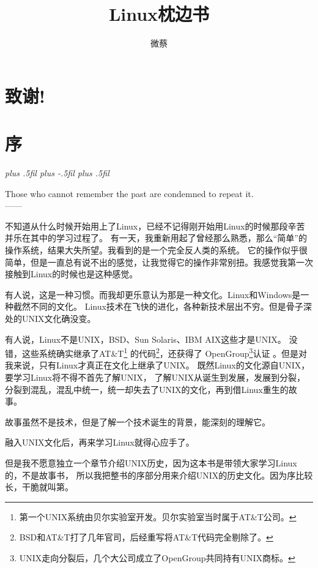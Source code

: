 \documentclass[amstex]{ctexbook}
\title{Linux枕边书}
\author{微蔡}
\newcommand{\RTLpar}{%
  \leftskip=0pt plus .5fil%
  \rightskip=0pt plus -.5fil%
  \parfillskip=0pt plus .5fil%
}
\newenvironment{quotes}[2][0.55]{\pushQED{#2}%
\begin{flushright}%
\begin{minipage}{#1\textwidth}\begin{flushright}\noindent\it\RTLpar}{%
 \\------\popQED{}\end{flushright}\end{minipage}\end{flushright}}%
\begin{document}



\chapter*{致谢!}



\tableofcontents

\chapter{序}
\begin{quotes}{George Santayana}
Those who cannot remember the past are condemned to repeat it.
\end{quotes}


不知道从什么时候开始用上了Linux，已经不记得刚开始用Linux的时候那段辛苦并乐在其中的学习过程了。
有一天，我重新用起了曾经那么熟悉，那么“简单”的操作系统，结果大失所望。我看到的是一个完全反人类的系统。
它的操作似乎很简单，但是一直总有说不出的感觉，让我觉得它的操作非常别扭。我感觉我第一次接触到Linux的时候也是这种感觉。

有人说，这是一种习惯。而我却更乐意认为那是一种文化。Linux和Windows是一种截然不同的文化。
Linux技术在飞快的进化，各种新技术层出不穷。但是骨子深处的UNIX文化确没变。

有人说，Linux不是UNIX，BSD、Sun Solaris、IBM AIX这些才是UNIX。
没错，这些系统确实继承了AT\&T\footnote{第一个UNIX系统由贝尔实验室开发。贝尔实验室当时属于AT\&T公司。}
的代码\footnote{BSD和AT\&T打了几年官司，后经重写将AT\&T代码完全剔除了。}，还获得了
OpenGroup\footnote{UNIX走向分裂后，几个大公司成立了OpenGroup共同持有UNIX商标。}认证
。但是对我来说，只有Linux才真正在文化上继承了UNIX。
既然Linux的文化源自UNIX，要学习Linux将不得不首先了解UNIX，
了解UNIX从诞生到发展，发展到分裂，分裂到混乱，混乱中统一，统一却失去了UNIX的文化，再到借Linux重生的故事。

故事虽然不是技术，但是了解一个技术诞生的背景，能深刻的理解它。

融入UNIX文化后，再来学习Linux就得心应手了。

但是我不愿意独立一个章节介绍UNIX历史，因为这本书是带领大家学习Linux的，不是故事书，
所以我把整书的序部分用来介绍UNIX的历史文化。因为序比较长，干脆就叫第。
\end{document}
